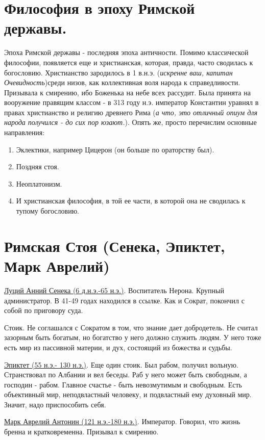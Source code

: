 \section{Философия в эпоху Римской державы.}
Эпоха Римской державы - последняя эпоха античности. Помимо классической философии, появляется еще и христианская, которая, правда, часто сводилась к богословию. Христианство зародилось в 1 в.н.э. (\textit{искренне ваш, капитан Очевидность})среди низов, как коллективная воля народа к справедливости. Призывала к смирению, ибо Боженька на небе всех рассудит. Была принята на вооружение правящим классом - в 313 году н.э. император Константин уравнял в правах христианство и религию древнего Рима (\textit{а что, это отличный опиум для народа получился - до сих пор юзают.}). Опять же, просто перечислим основные направления:
\begin{enumerate}
\item Эклектики, например Цицерон (он больше по ораторству был).
\item Поздняя стоя. 
\item Неоплатонизм.
\item И христианская философия, в той ее части, в которой она не сводилась к тупому богословию.
\end{enumerate}


\section{Римская Стоя (Сенека, Эпиктет, Марк Аврелий)}
\underline{Луций Анний Сенека  (6 д.н.э.-65 н.э.)}. Воспитатель Нерона. Крупный администратор. В 41-49 годах находился в ссылке. Как и Сократ, покончил с собой по приговору суда.

Стоик. Не соглашался с Сократом в том, что знание дает добродетель. Не считал зазорным быть богатым, но богатство у него должно служить людям. У него тоже есть мир из пассивной материи, и дух, состоящий из божества и судьбы. 

\underline{Эпиктет (55 н.э.- 130 н.э.)}. Еще один стоик. Был рабом, получил вольную. Странствовал по Албании и вел беседы. Раб у него может быть свободным, а господин - рабом. Главное счастье - быть невозмутимым и свободным. Есть объективный мир, неподвластный человеку, и подвластный ему духовный мир. Значит, надо приспособить себя.

\underline{Марк Аврелий Антонин (121 н.э.-180 н.э.)}. Император. Говорил, что жизнь бренна и кратковременна. Призывал к смирению.


